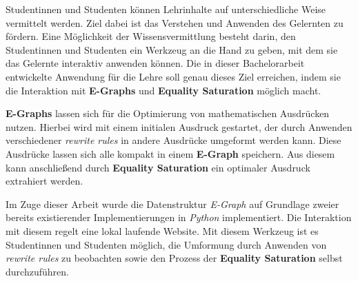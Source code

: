 
Studentinnen und Studenten können Lehrinhalte auf unterschiedliche Weise vermittelt werden.
Ziel dabei ist das Verstehen und Anwenden des Gelernten zu fördern.
Eine Möglichkeit der Wissensvermittlung besteht darin, den Studentinnen und Studenten ein
Werkzeug an die Hand zu geben, mit dem sie das Gelernte interaktiv anwenden können.
Die in dieser Bachelorarbeit entwickelte Anwendung für die Lehre soll genau dieses Ziel erreichen, 
indem sie die Interaktion mit \textbf{E-Graphs} und \textbf{Equality Saturation} möglich macht.

\textbf{E-Graphs} lassen sich für die Optimierung von mathematischen Ausdrücken nutzen.
Hierbei wird mit einem initialen Ausdruck gestartet, der durch Anwenden verschiedener 
\textit{rewrite rules} in andere Ausdrücke umgeformt werden kann.
Diese Ausdrücke lassen sich alle kompakt in einem \textbf{E-Graph} speichern. Aus diesem
kann anschließend durch \textbf{Equality Saturation} ein optimaler Ausdruck extrahiert werden.

Im Zuge dieser Arbeit wurde die Datenstruktur \textit{E-Graph} auf Grundlage zweier bereits existierender Implementierungen
in \textit{Python} implementiert. Die Interaktion mit diesem regelt eine lokal laufende Website.
Mit diesem Werkzeug ist es Studentinnen und Studenten möglich, die Umformung durch Anwenden von \textit{rewrite rules}
zu beobachten sowie den Prozess der \textbf{Equality Saturation} selbst durchzuführen.

